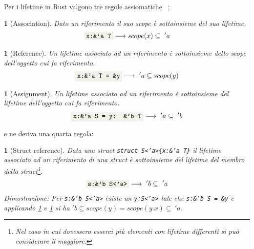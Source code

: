 \documentclass[Lau,binding=0.6cm]{sapthesis}
\newtheorem{lemma}[theorem]{}
\newcommand{\textcode}[1]{\colorbox{backcolour}{\texttt{#1}}}
\begin{document}
Per i lifetime in Rust valgono tre regole assiomatiche ~\cite{mechpen:misundestand}:

\begin{lemma}[Association] \label{lemma:association}
    Dato un riferimento il suo scope è sottoinsieme del suo lifetime.
    \begin{equation*}
        \textnormal{\textcode{x:\&'a T}} \longrightarrow  scope(x) \subseteq \ 'a
    \end{equation*}
\end{lemma}

\begin{lemma}[Reference] \label{lemma:reference}
    Un lifetime associato ad un riferimento è sottoinsieme dello scope dell'oggetto cui fa riferimento. 
    \begin{equation*}
        \textnormal{\textcode{x:\&'a T = \&y}} \longrightarrow \ 'a \subseteq scope(y)
    \end{equation*}
\end{lemma}

\begin{lemma}[Assignment] \label{lemma:assignment}
    Un lifetime associato ad un riferimento è sottoinsieme del lifetime dell'oggetto cui fa riferimento.
    \begin{equation*}
        \textnormal{\textcode{x:\&'a S = y: \&'b T}} \longrightarrow \ 'a \subseteq \ 'b
    \end{equation*}
\end{lemma}

e ne deriva una quarta regola:

\begin{lemma}[Struct reference] \label{lemma:struct_reference}
    Data una struct \textnormal{\textcode{struct S<'a>\{x:\&'a T\}}} il lifetime associato ad un riferimento di una struct è sottoinsieme del lifetime del membro della struct\footnote{Nel caso in cui dovessero esserci più elementi con lifetime differenti si può considerare il maggiore.}.
    \begin{equation*}
        \textnormal{\textcode{s:\&'b S<'a>}} \longrightarrow \ 'b \subseteq \ 'a
    \end{equation*}
    Dimostrazione: \textnormal{Per \textnormal{\textcode{s:\&'b S<'a>}} esiste un \textcode{y:S<'a>} tale che \textcode{s:\&'b S = \&y} e applicando \ref{lemma:reference} e \ref{lemma:association} si ha} $ 'b \subseteq scope(y) = scope(y.x) \subseteq \ 'a  $.
\end{lemma}
\end{document}

